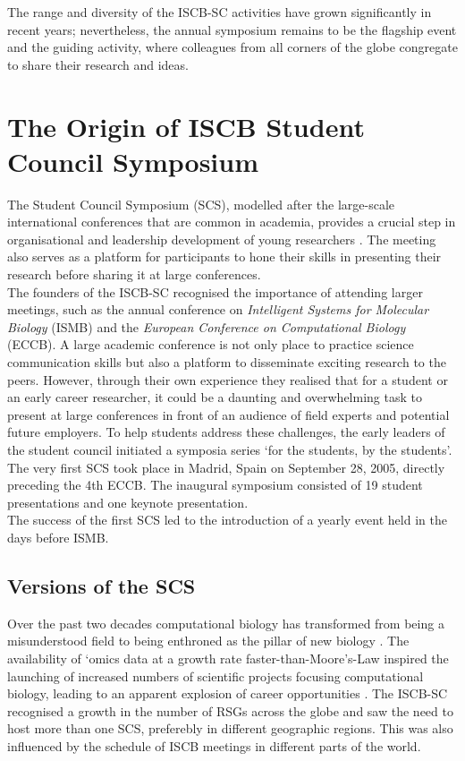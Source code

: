 \documentclass[]{article}%
\begin{document}
	The range and diversity of the ISCB-SC activities have grown significantly in recent years; nevertheless,  the annual symposium remains to be the flagship event and the guiding activity, where colleagues from all corners of the globe congregate to share their research and ideas.
	
	
	\section*{The Origin of ISCB Student Council Symposium}
	
	The Student Council Symposium (SCS), modelled after the large-scale international conferences that are common in academia, provides a crucial step in organisational and leadership development of young researchers \citep{corpas2005}. The meeting also serves as a platform for participants to hone their skills in presenting their research before sharing it at large conferences.\\
	
	The founders of the ISCB-SC recognised the importance of attending larger meetings, such as the annual conference on \textit{Intelligent Systems for Molecular Biology} (ISMB)  and the  \textit{European Conference on Computational Biology} (ECCB). A large academic conference is not only  place to practice science communication skills but also a platform to  disseminate exciting research to the peers. However, through their own experience they realised that for a student or an early career researcher, it could be a daunting and overwhelming task to present at large conferences in front of an audience of field experts and potential future employers. To help students address these challenges, the early leaders of the student council initiated a symposia series  `for the students, by the students'. The very first SCS took place in Madrid, Spain on September 28, 2005, \citep{roderic2005, corpas2005} directly preceding the 4th ECCB. The inaugural symposium consisted of 19 student presentations and one keynote presentation.\\
	
	The success of the first SCS led to the introduction of a yearly event held in the days before ISMB. 
	
	\subsection*{Versions of the SCS}
	
	Over the past two decades computational biology has transformed from being a misunderstood field \citep{bioinformaticsmyths} to being enthroned as the pillar of new biology \citep{riseanddemise}. The availability of `omics data at a growth rate faster-than-Moore’s-Law \citep{Berger2016} inspired the launching of increased numbers of scientific projects focusing computational biology, leading to an apparent explosion of career opportunities \citep{careerexplosion}. The ISCB-SC recognised a growth in the number of RSGs across the globe and saw the need to host more than one SCS, preferebly in different geographic regions. This was also influenced by the schedule of ISCB meetings in different parts of the world.
	
\end{document}
